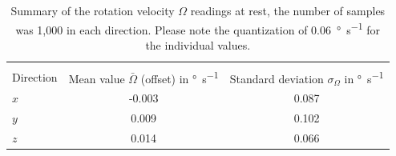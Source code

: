 \documentclass[DIV=14]{scrartcl}
\begin{document}
    \begin{table}[h]
        \begin{tabular}{lS[table-format=1.3]S[table-format=1.3]}
            \hline \vspace{-1em} \\
            Direction & {Mean value $\bar{\mathit{\Omega}}$ (offset) in \si{\degree\per\second}} & {Standard deviation $\sigma_\Omega$ in \si{\degree\per\second}} \\ \hline
            $x$       & -0.003                                                                   & 0.087                                                           \\
            $y$       & 0.009                                                                    & 0.102                                                           \\
            $z$       & 0.014                                                                    & 0.066                                                           \\ \hline
        \end{tabular}
        \caption{Summary of the rotation velocity $\mathit{\Omega}$ readings at rest, the number of samples was 1,000 in each direction. Please note the quantization of \SI{0.06}{\degree\per\second} for the individual values.}
        \label{tab:gyro}
    \end{table}
%

    \vspace{1em}
\end{document}
